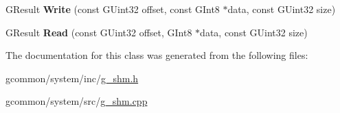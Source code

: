 \begin{DoxyCompactItemize}
\item 
\hypertarget{class_shm_ab337d9ff23973904552d9b60c6e19221}{G\-Result {\bfseries Write} (const G\-Uint32 offset, const G\-Int8 $\ast$data, const G\-Uint32 size)}\label{class_shm_ab337d9ff23973904552d9b60c6e19221}

\item 
\hypertarget{class_shm_afb2be3a86981bdf248563397463d73ec}{G\-Result {\bfseries Read} (const G\-Uint32 offset, G\-Int8 $\ast$data, const G\-Uint32 size)}\label{class_shm_afb2be3a86981bdf248563397463d73ec}

\end{DoxyCompactItemize}


The documentation for this class was generated from the following files\-:\begin{DoxyCompactItemize}
\item 
gcommon/system/inc/\hyperlink{g__shm_8h}{g\-\_\-shm.\-h}\item 
gcommon/system/src/\hyperlink{g__shm_8cpp}{g\-\_\-shm.\-cpp}\end{DoxyCompactItemize}
